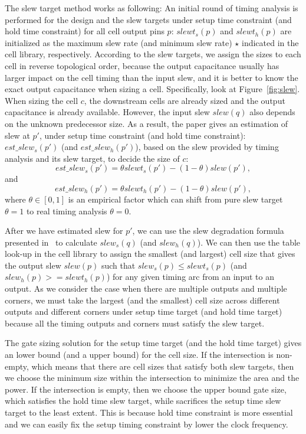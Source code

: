 The slew target method works as following: An initial round of timing analysis is performed for the design and the slew targets under setup time constraint (and hold time constraint) for all cell output pins $p$: $slewt_s(p)$ and $slewt_h(p)$ are initialized as the maximum slew rate (and minimum slew rate) $\star$ indicated in the cell library, respectively. According to the slew targets, we assign the sizes to each cell in reverse topological order, because the output capacitance usually has larger impact on the cell timing than the input slew, and it is better to know the exact output capacitance when sizing a cell. Specifically, look at Figure~\ref{fig:slew}. When sizing the cell $c$, the downstream cells are already sized and the output capacitance is already available. However, the input slew $slew(q)$ also depends on the unknown predecessor size. As a result, the paper gives an estimation of slew at $p'$, under setup time constraint (and hold time constraint): $est\_slew_s(p')$ (and $est\_slew_h(p')$), based on the slew provided by timing analysis and its slew target, to decide the size of $c$:
\begin{equation}
est\_slew_s(p') = \theta slewt_s(p') - (1-\theta)slew(p'),
\end{equation}
and
\begin{equation}
est\_slew_h(p') = \theta slewt_h(p') - (1-\theta)slew(p'),
\end{equation}
where $\theta \in [0, 1]$ is an empirical factor which can shift from pure slew target $\theta = 1$ to real timing analysis $\theta = 0$.

After we have estimated slew for $p'$, we can use the slew degradation formula presented in~\cite{TAU:Contest} to calculate $slew_s(q)$ (and $slew_h(q)$). We can then use the table look-up in the cell library to assign the smallest (and largest) cell size that gives the output slew $slew(p)$ such that $slew_s(p) \leq slewt_s(p)$ (and $slew_h(p) >= slewt_h(p)$) for any given timing arc from an input to an output. As we consider the case when there are multiple outputs and multiple corners, we must take the largest (and the smallest) cell size across different outputs and different corners under setup time target (and hold time target) because all the timing outputs and corners must satisfy the slew target.

The gate sizing solution for the setup time target (and the hold time target) gives an lower bound (and a upper bound) for the cell size. If the intersection is non-empty, which means that there are cell sizes that satisfy both slew targets, then we choose the minimum size within the intersection to minimize the area and the power. If the intersection is empty, then we choose the upper bound gate size, which satisfies the hold time slew target, while sacrifices the setup time slew target to the least extent. This is because hold time constraint is more essential and we can easily fix the setup timing constraint by lower the clock frequency.

